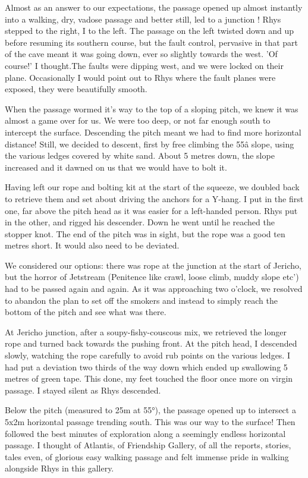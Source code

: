 \documentclass[onecolumn]{book}
\begin{document}
Almost as an answer to our expectations,  the passage opened up almost instantly into a walking, dry, vadose passage and better still, led to a junction ! Rhys stepped to the right, I to the left. The passage on the left twisted down and up before resuming its southern course,  but the fault control, pervasive in that part of the cave meant it was going down, ever so slightly towards the west. 'Of course!' I thought.The faults were dipping west, and we were locked on their plane. Occasionally I would point out to Rhys where the fault planes were exposed, they were beautifully smooth.

When the passage wormed it's way to the top of a sloping pitch, we knew it was almost a game over for us. We were too deep, or not far enough south to intercept the surface. Descending the pitch meant we had to find more horizontal distance! Still, we decided to descent, first by free climbing the 55â slope, using the various ledges covered by white sand. About 5 metres down, the slope increased and it dawned on us that we would have to bolt it. 

Having left our rope and bolting kit at the start of the squeeze, we doubled back to retrieve them and set about driving the anchors for a Y-hang. I put in the first one, far above the pitch head as it was easier for a left-handed person. Rhys put in the other, and rigged his descender. Down he went until he reached the stopper knot. The end of the pitch was in sight, but the rope was a good ten metres short. It would also need to be deviated.
 
We considered our options: there was rope at the junction at the start of Jericho, but the horror of Jetstream (Penitence like crawl, loose climb, muddy slope etc') had to be passed again and again.  As it was approaching two o'clock, we resolved to abandon the plan to set off the smokers and  instead to simply reach the bottom of the pitch and see what was there.

At Jericho junction, after a soupy-fishy-couscous mix, we retrieved the longer rope and turned back towards the pushing front. At the pitch head, I descended slowly, watching the rope carefully to avoid rub points on the various ledges. I had put a deviation two thirds of the way down which ended up swallowing 5 metres of green tape. This done, my feet touched the floor once more on virgin passage. I stayed silent as Rhys descended.
 
Below the pitch (measured to 25m at 55°), the passage opened up to intersect a 5x2m horizontal passage trending south. This was our way to the surface! Then followed the best minutes of exploration along a seemingly endless horizontal passage. I thought of Atlantis, of Friendship Gallery, of all the reports, stories, tales even, of glorious easy walking passage and felt immense pride in walking alongside Rhys in this gallery. 
\end{document}

